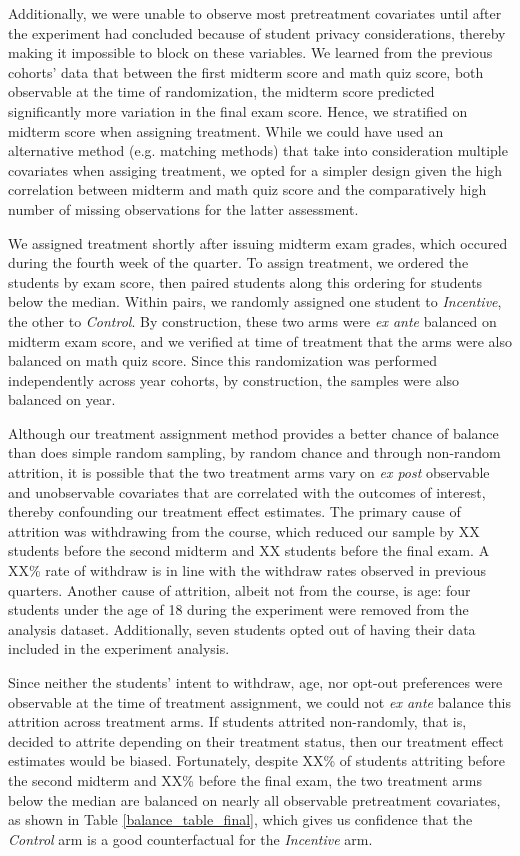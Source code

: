 \documentclass[12pt]{article}
\begin{document}
Additionally, we were unable to observe most pretreatment covariates until after the experiment had concluded because of student privacy considerations, thereby making it impossible to block on these variables. We learned from the previous cohorts' data that between the first midterm score and math quiz score, both observable at the time of randomization, the midterm score predicted significantly more variation in the final exam score. Hence, we stratified on midterm score when assigning treatment. While we could have used an alternative method (e.g. matching methods) that take into consideration multiple covariates when assiging treatment, we opted for a simpler design given the high correlation between midterm and math quiz score and the comparatively high number of missing observations for the latter assessment.

We assigned treatment shortly after issuing midterm exam grades, which occured during the fourth week of the quarter. To assign treatment, we ordered the students by exam score, then paired students along this ordering for students below the median. Within pairs, we randomly assigned one student to \textit{Incentive}, the other to \textit{Control}. By construction, these two arms were \textit{ex ante} balanced on midterm exam score, and we verified at time of treatment that the arms were also balanced on math quiz score. Since this randomization was performed independently across year cohorts, by construction, the samples were also balanced on year.

Although our treatment assignment method provides a better chance of balance than does simple random sampling, by random chance and through non-random attrition, it is possible that the two treatment arms vary on \textit{ex post} observable and unobservable covariates that are correlated with the outcomes of interest, thereby confounding our treatment effect estimates. The primary cause of attrition was withdrawing from the course, which reduced our sample by XX students before the second midterm and XX students before the final exam. A XX\% rate of withdraw is in line with the withdraw rates observed in previous quarters. Another cause of attrition, albeit not from the course, is age: four students under the age of 18 during the experiment were removed from the analysis dataset. Additionally, seven students opted out of having their data included in the experiment analysis.

Since neither the students' intent to withdraw, age, nor opt-out preferences were observable at the time of treatment assignment, we could not \textit{ex ante} balance this attrition across treatment arms. If students attrited non-randomly, that is, decided to attrite depending on their treatment status, then our treatment effect estimates would be biased. Fortunately, despite XX\% of students attriting before the second midterm and XX\% before the final exam, the two treatment arms below the median are balanced on nearly all observable pretreatment covariates, as shown in Table \ref{balance_table_final}, which gives us confidence that the \textit{Control} arm is a good counterfactual for the \textit{Incentive} arm.
\end{document}
